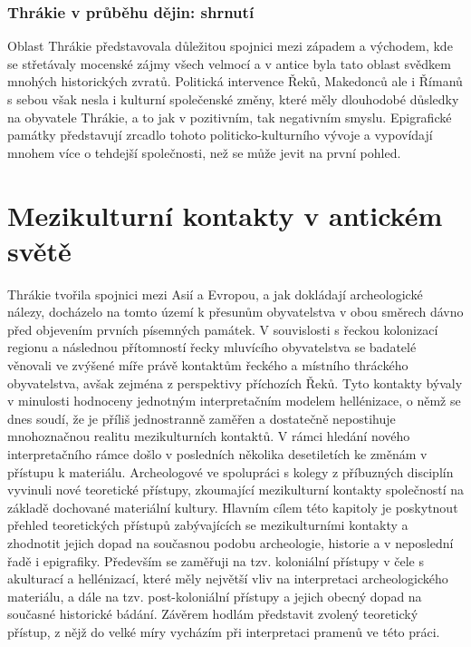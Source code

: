 \subsection[thrákie-v-průběhu-dějin-shrnutí]{Thrákie v průběhu dějin: shrnutí}

Oblast Thrákie představovala důležitou spojnici mezi západem a východem, kde se střetávaly mocenské zájmy všech velmocí a v antice byla tato oblast svědkem mnohých historických zvratů. Politická intervence Řeků, Makedonců ale i Římanů s sebou však nesla i kulturní společenské změny, které měly dlouhodobé důsledky na obyvatele Thrákie, a to jak v pozitivním, tak negativním smyslu. Epigrafické památky představují zrcadlo tohoto politicko-kulturního vývoje a vypovídají mnohem více o tehdejší společnosti, než se může jevit na první pohled.

\chapter{Mezikulturní kontakty v antickém světě}
Thrákie tvořila spojnici mezi Asií a Evropou, a jak dokládají archeologické nálezy, docházelo na tomto území k přesunům obyvatelstva v obou směrech dávno před objevením prvních písemných památek. V souvislosti s řeckou kolonizací regionu a následnou přítomností řecky mluvícího obyvatelstva se badatelé věnovali ve zvýšené míře právě kontaktům řeckého a místního thráckého obyvatelstva, avšak zejména z perspektivy příchozích Řeků. Tyto kontakty bývaly v minulosti hodnoceny jednotným interpretačním modelem hellénizace, o němž se dnes soudí, že je příliš jednostranně zaměřen a dostatečně nepostihuje mnohoznačnou realitu mezikulturních kontaktů. V rámci hledání nového interpretačního rámce došlo v posledních několika desetiletích ke změnám v přístupu k materiálu. Archeologové ve spolupráci s kolegy z příbuzných disciplín vyvinuli nové teoretické přístupy, zkoumající mezikulturní kontakty společností na základě dochované materiální kultury. Hlavním cílem této kapitoly je poskytnout přehled teoretických přístupů zabývajících se mezikulturními kontakty a zhodnotit jejich dopad na současnou podobu archeologie, historie a v neposlední řadě i epigrafiky. Především se zaměřuji na tzv. koloniální přístupy v čele s akulturací a hellénizací, které měly největší vliv na interpretaci archeologického materiálu, a dále na tzv. post-koloniální přístupy a jejich obecný dopad na současné historické bádání. Závěrem hodlám představit zvolený teoretický přístup, z nějž do velké míry vycházím při interpretaci pramenů ve této práci.

